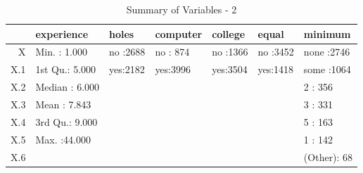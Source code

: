\begin{table}[ht]
\centering
\begin{tabular}{rllllll}
  \hline
 &   experience & holes & computer & college & equal &    minimum \\ 
  \hline
X & Min.   : 1.000   & no :2688   & no : 874   & no :1366   & no :3452   & none   :2746   \\ 
  X.1 & 1st Qu.: 5.000   & yes:2182   & yes:3996   & yes:3504   & yes:1418   & some   :1064   \\ 
  X.2 & Median : 6.000   &  &  &  &  & 2      : 356   \\ 
  X.3 & Mean   : 7.843   &  &  &  &  & 3      : 331   \\ 
  X.4 & 3rd Qu.: 9.000   &  &  &  &  & 5      : 163   \\ 
  X.5 & Max.   :44.000   &  &  &  &  & 1      : 142   \\ 
  X.6 &  &  &  &  &  & (Other):  68   \\ 
   \hline
\end{tabular}
\caption{Summary of Variables - 2} 
\label{tab:summary2}
\end{table}
